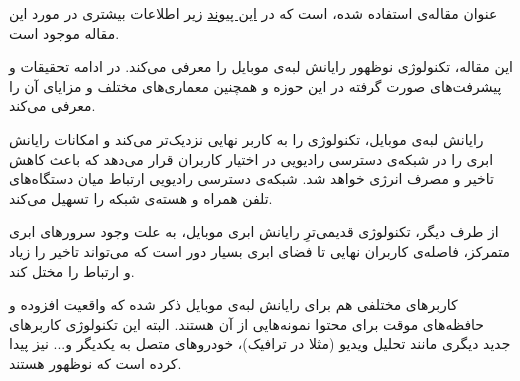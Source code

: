 عنوان مقاله‌ی استفاده شده، 
است که در 
\href{https://ieeexplore.ieee.org/document/8030322}{این پیوند}
زیر اطلاعات بیشتری در مورد این مقاله موجود است.

این مقاله، تکنولوژی نوظهور رایانش لبه‌ی موبایل 
را معرفی می‌کند. در ادامه تحقیقات و پیشرفت‌های صورت گرفته در این حوزه و همچنین معماری‌های مختلف و مزایای آن را معرفی می‌کند. 

رایانش لبه‌ی موبایل، تکنولوژی را به کاربر نهایی نزدیک‌تر می‌کند و امکانات رایانش ابری 
را در شبکه‌ی دسترسی رادیویی 
در اختیار کاربران قرار می‌دهد که باعث کاهش تاخیر 
و مصرف انرژی خواهد شد. شبکه‌ی دسترسی رادیویی ارتباط میان دستگاه‌های تلفن همراه و هسته‌ی شبکه را تسهیل می‌کند. 

از طرف دیگر، تکنولوژی قدیمی‌ترِ رایانش ابری موبایل، به علت وجود سرورهای ابری متمرکز، فاصله‌ی کاربران نهایی تا فضای ابری بسیار دور است که می‌تواند تاخیر را زیاد و ارتباط را مختل کند. 

کاربرهای مختلفی هم برای رایانش لبه‌ی موبایل ذکر شده که واقعیت افزوده 
و حافظه‌های موقت 
برای محتوا نمونه‌هایی از آن هستند. البته این تکنولوژی کاربرهای جدید دیگری مانند تحلیل ویدیو (مثلا در ترافیک)، خودروهای متصل به یکدیگر و... نیز پیدا کرده است که نوظهور هستند.
